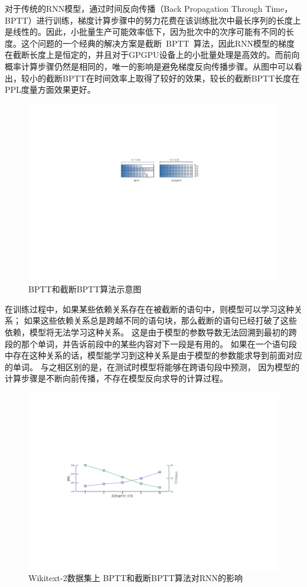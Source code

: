 对于传统的RNN模型，通过时间反向传播（Back Propagation Through Time，BPTT）进行训练，梯度计算步骤中的努力花费在该训练批次中最长序列的长度上是线性的。因此，小批量生产可能效率低下，因为批次中的次序可能有不同的长度。这个问题的一个经典的解决方案是截断~BPTT~算法，因此RNN模型的梯度在截断长度上是恒定的，并且对于GPGPU设备上的小批量处理是高效的。而前向概率计算步骤仍然是相同的，唯一的影响是避免梯度反向传播步骤。从图中可以看出，较小的截断BPTT在时间效率上取得了较好的效果，较长的截断BPTT长度在PPL度量方面效果更好。
\begin{figure}[!ht]
  \centering
  \includegraphics[width=.8\columnwidth]{./figures/minibatch.pdf}
  \caption{BPTT和截断BPTT算法示意图}\label{fig:minibatch}
\end{figure}

在训练过程中，如果某些依赖关系存在在被截断的语句中，则模型可以学习这种关系； 如果这些依赖关系总是跨越不同的语句块，那么截断的语句已经打破了这些依赖，模型将无法学习这种关系。 这是由于模型的参数导数无法回溯到最初的跨段的那个单词，并告诉前段中的某些内容对下一段是有用的。 
如果在一个语句段中存在这种关系的话，模型能学习到这种关系是由于模型的参数能求导到前面对应的单词。
与之相区别的是，在测试时模型将能够在跨语句段中预测， 因为模型的计算步骤是不断向前传播，不存在模型反向求导的计算过程。
\begin{figure}[!ht]
  \centering
  \includegraphics[width=.85\columnwidth]{./figures/tbptt.pdf}
  \caption{Wikitext-2数据集上 BPTT和截断BPTT算法对RNN的影响}\label{fig:tbptt}
\end{figure}
